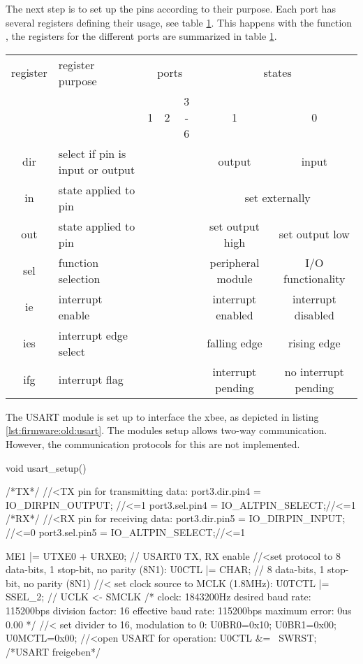 The next step is to set up the pins according to their purpose. Each port has several registers defining their usage, see table \ref{tab:firmware:portregisters}. This happens with the function , the registers for the different ports are summarized in table \ref{tab:firmware:portregisters}.
\begin{table}
	\centering
	\begin{tabular}{clccccc}
		\hline
		register & register purpose &\multicolumn{3}{c}{ports}&\multicolumn{2}{c}{states} \\
		 & & 1 & 2 & 3 - 6 & 1 & 0 \\\hline 
		dir & select if pin is input or output &\checkmark&\checkmark&\checkmark& output & input \\
		in & state applied to pin &\checkmark&\checkmark&\checkmark& \multicolumn{2}{c}{set externally}\\
		out & state applied to pin &\checkmark&\checkmark&\checkmark& set output high & set output low \\
		sel & function selection &\checkmark&\checkmark&\checkmark& peripheral module & I/O functionality\\
		ie & interrupt enable &\checkmark&\checkmark& & interrupt enabled & interrupt disabled\\
		ies & interrupt edge select &\checkmark&\checkmark&& falling edge & rising edge\\
		ifg & interrupt flag &\checkmark&\checkmark&& interrupt pending & no interrupt pending \\
		\hline
	\end{tabular}
	\label{tab:firmware:portregisters}
\end{table}
The USART module is set up to interface the \acs{xbee}, as depicted in listing \ref{lst:firmware:old:usart}. The modules setup allows two-way communication. However, the communication protocols for this are not implemented.
\begin{codecpp}[caption={Setup of the USART ports for communication with the \acs{xbee} \label{lst:firmware:old:usart}. Comments preceded with \textit{//<} were added for explanation.}]
void usart_setup() {
	/*TX*/
	//<TX pin for transmitting data: 
	port3.dir.pin4 = IO_DIRPIN_OUTPUT; //<=1
	port3.sel.pin4 = IO_ALTPIN_SELECT;//<=1
	/*RX*/
	//<RX pin for receiving data:
	port3.dir.pin5 = IO_DIRPIN_INPUT; //<=0
	port3.sel.pin5 = IO_ALTPIN_SELECT;//<=1
	
	ME1 |= UTXE0 + URXE0; // USART0 TX, RX enable
	//<set protocol to 8 data-bits, 1 stop-bit, no parity (8N1):
	U0CTL |= CHAR;		 // 8 data-bits, 1 stop-bit, no parity (8N1)
	//< set clock source to MCLK (1.8MHz): 
	U0TCTL |= SSEL_2;	 // UCLK <- SMCLK	
	/* clock: 1843200Hz
	desired baud rate: 115200bps
	division factor: 16
	effective baud rate: 115200bps
	maximum error: 0us 0.00%
	*/	
	//< set divider to 16, 	modulation to 0:
	U0BR0=0x10; U0BR1=0x00;	U0MCTL=0x00;
	//<open USART for operation:
	U0CTL &= ~SWRST;			/*USART freigeben*/
}
\end{codecpp}
